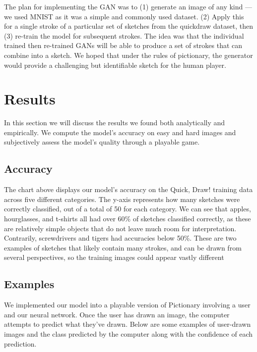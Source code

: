 \documentclass[10pt,twocolumn,letterpaper]{article}
\begin{document}
The plan for implementing the GAN was to (1) generate an image of any kind — we used MNIST as it was  a simple and commonly used dataset. (2) Apply this for a single stroke of a particular set of sketches from the quickdraw dataset, then (3) re-train the model for subsequent strokes. The idea was that the individual trained then re-trained GANs will be able to produce a set of strokes that can combine into a sketch. We hoped that under the rules of pictionary, the generator would provide a challenging but identifiable sketch for the human player.

\section{Results}

In this section we will discuss the results we found both analytically and empirically. We compute the model’s accuracy on easy and hard images and subjectively assess the model’s quality through a playable game.

\subsection{Accuracy}

The chart above displays our model’s accuracy on the Quick, Draw! training data across five different categories. The y-axis represents how many sketches were correctly classified, out of a total of 50 for each category. We can see that apples, hourglasses, and t-shirts all had over 60\% of sketches classified correctly, as these are relatively simple objects that do not leave much room for interpretation. Contrarily, screwdrivers and tigers had accuracies below 50\%. These are two examples of sketches that likely contain many strokes, and can be drawn from several perspectives, so the training images could appear vastly different

\subsection{Examples}

We implemented our model into a playable version of Pictionary involving a user and our neural network. Once the user has drawn an image, the computer attempts to predict what they’ve drawn. Below are some examples of user-drawn images and the class predicted by the computer along with the confidence of each prediction.
\end{document}

